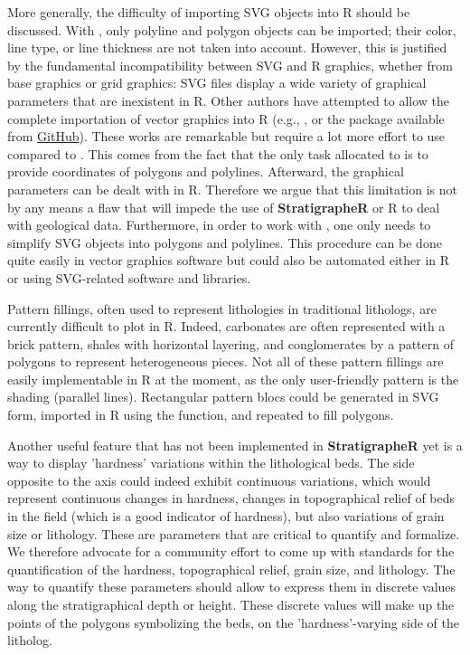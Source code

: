 More generally, the difficulty of importing SVG objects into R should be discussed. With , only polyline and polygon objects can be imported; their color, line type, or line thickness are not taken into account. However, this is justified by the fundamental incompatibility between SVG and R graphics, whether from base graphics or grid graphics: SVG files display a wide variety of graphical parameters that are inexistent in R. Other authors have attempted to allow the complete importation of vector graphics into R (e.g.,  \citep{murrell_importing_2009}, or the  package available from \href{https://github.com/richfitz/vectoR}{GitHub}). These works are remarkable but require a lot more effort to use compared to . This comes from the fact that the only task allocated to  is to provide coordinates of polygons and polylines. Afterward, the graphical parameters can be dealt with in R. Therefore we argue that this limitation is not by any means a flaw that will impede the use of \textbf{StratigrapheR} or R to deal with geological data. Furthermore, in order to work with , one only needs to simplify SVG objects into polygons and polylines. This procedure can be done quite easily in vector graphics software but could also be automated either in R or using SVG-related software and libraries. 

Pattern fillings, often used to represent lithologies in traditional lithologs, are currently difficult to plot in R. Indeed, carbonates are often represented with a brick pattern, shales with horizontal layering, and conglomerates by a pattern of polygons to represent heterogeneous pieces. Not all of these pattern fillings are easily implementable in R at the moment, as the only user-friendly pattern is the shading (parallel lines). Rectangular pattern blocs could be generated in SVG form, imported in R using the  function, and repeated to fill polygons.

Another useful feature that has not been implemented in \textbf{StratigrapheR} yet is a way to display 'hardness' variations within the lithological beds. The side opposite to the axis could indeed exhibit continuous variations, which would represent continuous changes in hardness, changes in topographical relief of beds in the field (which is a good indicator of hardness), but also variations of grain size or lithology. These are parameters that are critical to quantify and formalize. We therefore advocate for a community effort to come up with standards for the quantification of the hardness, topographical relief, grain size, and lithology. The way to quantify these parameters should allow to express them in discrete values along the stratigraphical depth or height. These discrete values will make up the points of the polygons symbolizing the beds, on the 'hardness'-varying side of the litholog.

